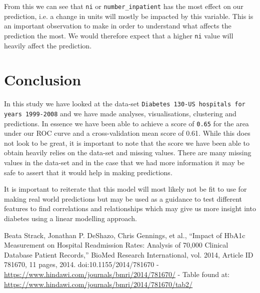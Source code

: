 \documentclass[11pt]{report}
\newcommand{\linespace}{\vspace{0.3cm}\noindent}
\begin{document}
\linespace
From this we can see that \texttt{ni} or \texttt{number\_inpatient} has the most effect on our prediction, i.e. a change in units will mostly be impacted by this variable. This is an important observation to make in order to understand what affects the prediction the most. We would therefore expect that a higher \texttt{ni} value will heavily affect the prediction. 

\section{Conclusion}
In this study we have looked at the data-set \texttt{Diabetes 130-US hospitals for years 1999-2008} and we have made analyses, visualisations, clustering and predictions. In essence we have been able to achieve a score of \texttt{0.65} for the area under our ROC curve and a cross-validation mean score of 0.61. While this does not look to be great, it is important to note that the score we have been able to obtain heavily relies on the data-set and missing values. There are many missing values in the data-set and in the case that we had more information it may be safe to assert that it would help in making predictions.

\linespace
It is important to reiterate that this model will most likely not be fit to use for making real world predictions but may be used as a guidance to test different features to find correlations and relationships which may give us more insight into diabetes using a linear modelling approach.

  \begin{thebibliography}{1}

   Beata Strack, Jonathan P. DeShazo, Chris Gennings, et al., “Impact of HbA1c Measurement on Hospital Readmission Rates: Analysis of 70,000 Clinical Database Patient Records,” BioMed Research International, vol. 2014, Article ID 781670, 11 pages, 2014. doi:10.1155/2014/781670 - \url{https://www.hindawi.com/journals/bmri/2014/781670/} - Table found at: \url{https://www.hindawi.com/journals/bmri/2014/781670/tab2/}

  \end{thebibliography}
\end{document}
